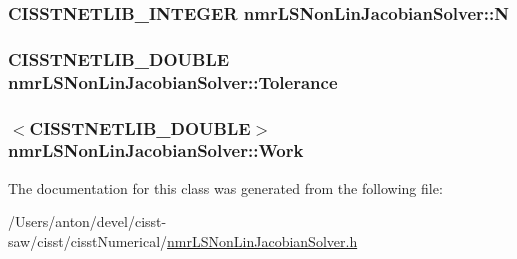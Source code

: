 \subsubsection[{N}]{\setlength{\rightskip}{0pt plus 5cm}C\+I\+S\+S\+T\+N\+E\+T\+L\+I\+B\+\_\+\+I\+N\+T\+E\+G\+E\+R nmr\+L\+S\+Non\+Lin\+Jacobian\+Solver\+::\+N\hspace{0.3cm}{\ttfamily [protected]}}\label{classnmr_l_s_non_lin_jacobian_solver_a50c6b56a17774e8eaaf37be19419f9b2}
\hypertarget{classnmr_l_s_non_lin_jacobian_solver_ad2dd832ff0445b614dd62570e1b3c43d}{}
\subsubsection[{Tolerance}]{\setlength{\rightskip}{0pt plus 5cm}C\+I\+S\+S\+T\+N\+E\+T\+L\+I\+B\+\_\+\+D\+O\+U\+B\+L\+E nmr\+L\+S\+Non\+Lin\+Jacobian\+Solver\+::\+Tolerance\hspace{0.3cm}{\ttfamily [protected]}}\label{classnmr_l_s_non_lin_jacobian_solver_ad2dd832ff0445b614dd62570e1b3c43d}
\hypertarget{classnmr_l_s_non_lin_jacobian_solver_ac686feb241cffda475935e624c67d1bc}{}
\subsubsection[{Work}]{$<$C\+I\+S\+S\+T\+N\+E\+T\+L\+I\+B\+\_\+\+D\+O\+U\+B\+L\+E$>$ nmr\+L\+S\+Non\+Lin\+Jacobian\+Solver\+::\+Work\hspace{0.3cm}{\ttfamily [protected]}}\label{classnmr_l_s_non_lin_jacobian_solver_ac686feb241cffda475935e624c67d1bc}


The documentation for this class was generated from the following file\+:\begin{DoxyCompactItemize}
\item 
/\+Users/anton/devel/cisst-\/saw/cisst/cisst\+Numerical/\hyperlink{nmr_l_s_non_lin_jacobian_solver_8h}{nmr\+L\+S\+Non\+Lin\+Jacobian\+Solver.\+h}\end{DoxyCompactItemize}
